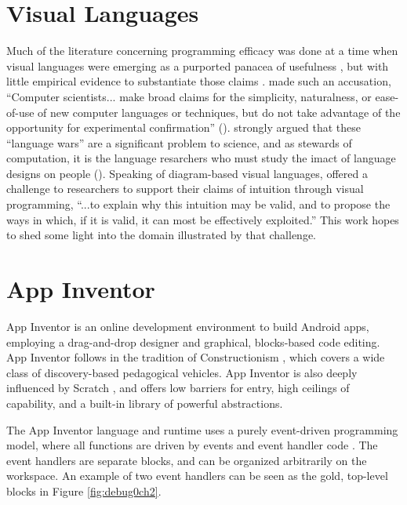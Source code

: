 \section{Visual Languages}
\label{sec:visual-languages}

Much of the literature concerning programming efficacy was done at a time when visual languages were emerging as a purported panacea of usefulness \citep{shu-1988}, but with little empirical evidence to substantiate those claims \citep{petre-1995}. \citeauthor{sch-1980} made such an accusation, ``Computer scientists... make broad claims for the simplicity, naturalness, or ease-of-use of new computer languages or techniques, but do not take advantage of the opportunity for experimental confirmation'' (\citeyear{sch-1980}). \citeauthor{stefik2014programming} strongly argued that these ``language wars'' are a significant problem to science, and as stewards of computation, it is the language resarchers who must study the imact of language designs on people (\citeyear{stefik2014programming}). Speaking of diagram-based visual languages, \citet{blackwell-2001} offered a challenge to researchers to support their claims of intuition through visual programming, ``...to explain why this intuition may be valid, and to propose the ways in which, if it is valid, it can most be effectively exploited.'' This work hopes to shed some light into the domain illustrated by that challenge. 


\section{App Inventor}
\label{sec:app-inventor-background}
App Inventor is an online development environment to build Android apps, employing a drag-and-drop designer and graphical, blocks-based code editing. App Inventor follows in the tradition of Constructionism \citep{papert1991situating}, which covers a wide class of discovery-based pedagogical vehicles. App Inventor is also deeply influenced by Scratch \citep{resnick2009scratch}, and offers low barriers for entry, high ceilings of capability, and a built-in library of powerful abstractions.

The App Inventor language and runtime uses a purely event-driven programming model, where all functions are driven by events and event handler code \citep{turbak-2014}. The event handlers are separate blocks, and can be organized arbitrarily on the workspace. An example of two event handlers can be seen as the gold, top-level blocks in Figure \ref{fig:debug0ch2}. 


